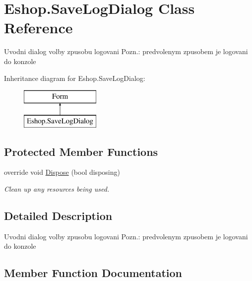\hypertarget{class_eshop_1_1_save_log_dialog}{}\section{Eshop.\+Save\+Log\+Dialog Class Reference}
\label{class_eshop_1_1_save_log_dialog}


Uvodni dialog volby zpusobu logovani Pozn.\+: predvolenym zpusobem je logovani do konzole  


Inheritance diagram for Eshop.\+Save\+Log\+Dialog\+:\begin{figure}[H]
\begin{center}
\leavevmode
\includegraphics[height=2.000000cm]{class_eshop_1_1_save_log_dialog}
\end{center}
\end{figure}
\subsection*{Protected Member Functions}
\begin{DoxyCompactItemize}
\item 
override void \mbox{\hyperlink{class_eshop_1_1_save_log_dialog_a9505c9f0304017ac6fcb9b195b9bd7fa}{Dispose}} (bool disposing)
\begin{DoxyCompactList}\small\item\em Clean up any resources being used. \end{DoxyCompactList}\end{DoxyCompactItemize}


\subsection{Detailed Description}
Uvodni dialog volby zpusobu logovani Pozn.\+: predvolenym zpusobem je logovani do konzole 



\subsection{Member Function Documentation}
\mbox{\label{class_eshop_1_1_save_log_dialog_a9505c9f0304017ac6fcb9b195b9bd7fa}} 
